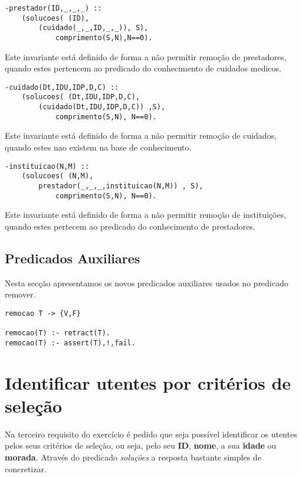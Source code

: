 \documentclass{report}
\def\titulo#1{\section{#1}}
\begin{document}
\begin{verbatim}
-prestador(ID,_,_,_) :: 
    (solucoes( (ID), 
        (cuidado(_,_,ID,_,_)), S),
            comprimento(S,N),N==0).
\end{verbatim}
Este invariante está definido de forma a não permitir remoção de prestadores, quando estes pertencem ao predicado do conhecimento de cuidados medicos.
\bigbreak

\begin{verbatim}
-cuidado(Dt,IDU,IDP,D,C) :: 
    (solucoes( (Dt,IDU,IDP,D,C), 
        (cuidado(Dt,IDU,IDP,D,C)) ,S),
            comprimento(S,N), N==0).
\end{verbatim}
Este invariante está definido de forma a não permitir remoção de cuidados, quando estes nao existem na base de conhecimento.
\bigbreak

\begin{verbatim}
-instituicao(N,M) ::   
    (solucoes( (N,M), 
        prestador(_,_,_,instituicao(N,M)) , S),
            comprimento(S,N), N==0).
\end{verbatim} 
Este invariante está definido de forma a não permitir remoção de instituições, quando estes pertecem ao predicado do conhecimento de prestadores.
\bigbreak

 
\subsection{Predicados Auxiliares}

Nesta secção apresentamos os novos predicados auxiliares usados no predicado remover.

\begin{verbatim}
remocao T -> {V,F}

remocao(T) :- retract(T).
remocao(T) :- assert(T),!,fail.
\end{verbatim}



























\titulo{Identificar utentes por critérios de seleção}

Na terceiro requisito do exercício é pedido que seja possível identificar os utentes pelos seus critérios de seleção, ou seja, pelo seu \textbf{ID}, \textbf{nome}, a sua \textbf{idade} ou \textbf{morada}. Através do predicado \textit{soluções} a resposta bastante simples de concretizar.
\end{document}
